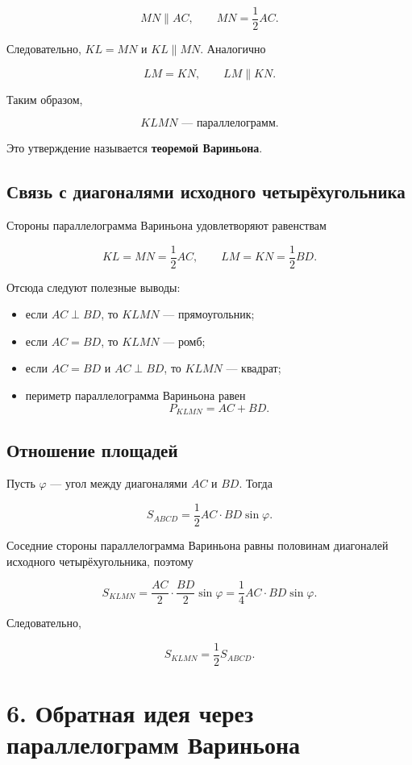 \documentclass[a4paper,12pt]{article}
\begin{document}
\[
MN\parallel AC,
\qquad
MN=\frac12 AC.
\]

Следовательно, $KL=MN$ и $KL\parallel MN$. Аналогично

\[
LM=KN,
\qquad
LM\parallel KN.
\]

Таким образом,

\[
\boxed{KLMN\text{ --- параллелограмм}.}
\]

Это утверждение называется \textbf{теоремой Вариньона}.

\subsection*{\color{darkaccent}Связь с диагоналями исходного четырёхугольника}

Стороны параллелограмма Вариньона удовлетворяют равенствам

\[
KL=MN=\frac12 AC,
\qquad
LM=KN=\frac12 BD.
\]

Отсюда следуют полезные выводы:

\begin{itemize}
    \item если $AC\perp BD$, то $KLMN$ --- прямоугольник;
    \item если $AC=BD$, то $KLMN$ --- ромб;
    \item если $AC=BD$ и $AC\perp BD$, то $KLMN$ --- квадрат;
    \item периметр параллелограмма Вариньона равен
    \[
    P_{KLMN}=AC+BD.
    \]
\end{itemize}

\subsection*{\color{darkaccent}Отношение площадей}

Пусть $\varphi$ --- угол между диагоналями $AC$ и $BD$. Тогда

\[
S_{ABCD}=\frac12 AC\cdot BD\sin\varphi.
\]

Соседние стороны параллелограмма Вариньона равны половинам диагоналей исходного четырёхугольника, поэтому

\[
S_{KLMN}
=
\frac{AC}{2}\cdot\frac{BD}{2}\sin\varphi
=
\frac14 AC\cdot BD\sin\varphi.
\]

Следовательно,

\[
\boxed{S_{KLMN}=\frac12 S_{ABCD}}.
\]

\section*{\color{darkaccent}6. Обратная идея через параллелограмм Вариньона}
\end{document}
